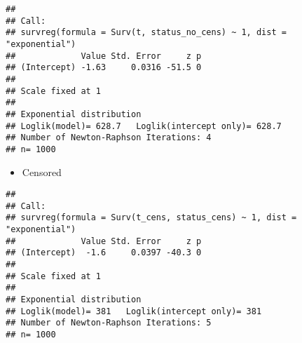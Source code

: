 \documentclass[]{book}
\newenvironment{Shaded}{\begin{snugshade}}{\end{snugshade}}
\newcommand{\KeywordTok}[1]{\textcolor[rgb]{0.13,0.29,0.53}{\textbf{{#1}}}}
\newcommand{\DataTypeTok}[1]{\textcolor[rgb]{0.13,0.29,0.53}{{#1}}}
\newcommand{\DecValTok}[1]{\textcolor[rgb]{0.00,0.00,0.81}{{#1}}}
\newcommand{\StringTok}[1]{\textcolor[rgb]{0.31,0.60,0.02}{{#1}}}
\newcommand{\CommentTok}[1]{\textcolor[rgb]{0.56,0.35,0.01}{\textit{{#1}}}}
\newcommand{\NormalTok}[1]{{#1}}
\providecommand{\tightlist}{%
  \setlength{\itemsep}{0pt}\setlength{\parskip}{0pt}}
\theoremstyle{definition}
\theoremstyle{definition}
\theoremstyle{definition}
\theoremstyle{remark}
\begin{document}
\begin{Shaded}
\end{Shaded}

\begin{verbatim}
## 
## Call:
## survreg(formula = Surv(t, status_no_cens) ~ 1, dist = "exponential")
##             Value Std. Error     z p
## (Intercept) -1.63     0.0316 -51.5 0
## 
## Scale fixed at 1 
## 
## Exponential distribution
## Loglik(model)= 628.7   Loglik(intercept only)= 628.7
## Number of Newton-Raphson Iterations: 4 
## n= 1000
\end{verbatim}

\begin{itemize}
\tightlist
\item
  Censored
\end{itemize}

\begin{Shaded}
\end{Shaded}

\begin{verbatim}
## 
## Call:
## survreg(formula = Surv(t_cens, status_cens) ~ 1, dist = "exponential")
##             Value Std. Error     z p
## (Intercept)  -1.6     0.0397 -40.3 0
## 
## Scale fixed at 1 
## 
## Exponential distribution
## Loglik(model)= 381   Loglik(intercept only)= 381
## Number of Newton-Raphson Iterations: 5 
## n= 1000
\end{verbatim}
\end{document}
